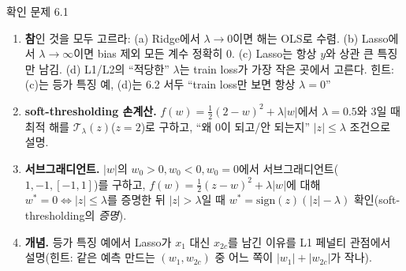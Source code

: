 \documentclass[aspectratio=169,11pt]{beamer}
\begin{document}
\begin{frame}{확인 문제 6.1}
  \small
  \begin{enumerate}
    \item \textbf{참}인 것을 모두 고르라: (a) Ridge에서 $\lambda\to0$이면 해는
      OLS로 수렴. (b) Lasso에서 $\lambda\to\infty$이면 bias 제외 모든 계수
      정확히 0. (c) Lasso는 항상 $y$와 상관 큰 특징만 남김.
      (d) L1/L2의 ``적당한'' $\lambda$는 train loss가 가장 작은 곳에서 고른다.
      \newline\newline
      {\footnotesize 힌트: (c)는 등가 특징 예, (d)는 6.2 서두 ``train loss만
      보면 항상 $\lambda=0$''}
    \item \textbf{soft-thresholding 손계산.} $f(w)=\frac12(2-w)^2+\lambda|w|$에서
      $\lambda=0.5$와 3일 때 최적 해를 $\mathcal{T}_\lambda(z)$($z=2$)로 구하고,
      ``왜 0이 되고/안 되는지'' $|z|\le\lambda$ 조건으로 설명.
    \item \textbf{서브그래디언트.} $|w|$의 $w_0>0, w_0<0, w_0=0$에서
      서브그래디언트($1, -1, [-1,1]$)를 구하고, $f(w)=\frac12(z-w)^2+\lambda|w|$에
      대해 $w^{*}=0 \iff |z|\le\lambda$를 증명한 뒤 $|z|>\lambda$일 때
      $w^{*}=\text{sign}(z)(|z|-\lambda)$ 확인(soft-thresholding의 \emph{증명}).
    \item \textbf{개념.} 등가 특징 예에서 Lasso가 $x_1$ 대신 $x_{2c}$를
      남긴 이유를 L1 페널티 관점에서 설명(힌트: 같은 예측 만드는
      $(w_1,w_{2c})$ 중 어느 쪽이 $|w_1|+|w_{2c}|$가 작나).
  \end{enumerate}
\end{frame}

\end{document}
